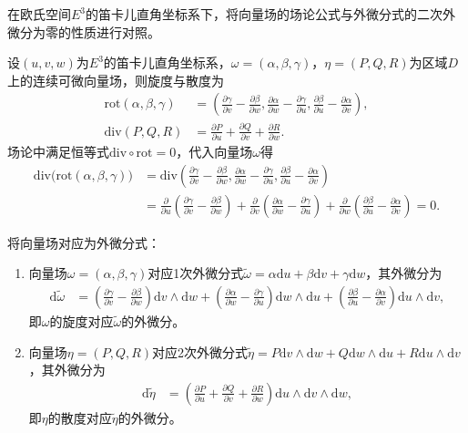 \documentclass[../../main.tex]{subfiles}%
\begin{document}
\begin{example}
在欧氏空间$E^3$的笛卡儿直角坐标系下，将向量场的场论公式与外微分式的二次外微分为零的性质进行对照。
\end{example}
\begin{solution}

设$(u,v,w)$为$E^3$的笛卡儿直角坐标系，$\omega=(\alpha,\beta,\gamma)$，$\eta=(P,Q,R)$为区域$D$上的连续可微向量场，则旋度与散度为
\begin{align*}
\mathrm{rot}(\alpha,\beta,\gamma) &= \left(\frac{\partial\gamma}{\partial v}-\frac{\partial\beta}{\partial w},\frac{\partial\alpha}{\partial w}-\frac{\partial\gamma}{\partial u},\frac{\partial\beta}{\partial u}-\frac{\partial\alpha}{\partial v}\right), \\
\mathrm{div}(P,Q,R) &= \frac{\partial P}{\partial u}+\frac{\partial Q}{\partial v}+\frac{\partial R}{\partial w}.
\end{align*}
场论中满足恒等式$\mathrm{div}\circ\mathrm{rot}=0$，代入向量场$\omega$得
\begin{align*}
\mathrm{div}\big(\mathrm{rot}(\alpha,\beta,\gamma)\big) &= \mathrm{div}\left(\frac{\partial\gamma}{\partial v}-\frac{\partial\beta}{\partial w},\frac{\partial\alpha}{\partial w}-\frac{\partial\gamma}{\partial u},\frac{\partial\beta}{\partial u}-\frac{\partial\alpha}{\partial v}\right) \\
&= \frac{\partial}{\partial u}\left(\frac{\partial\gamma}{\partial v}-\frac{\partial\beta}{\partial w}\right)+\frac{\partial}{\partial v}\left(\frac{\partial\alpha}{\partial w}-\frac{\partial\gamma}{\partial u}\right)+\frac{\partial}{\partial w}\left(\frac{\partial\beta}{\partial u}-\frac{\partial\alpha}{\partial v}\right)=0.
\end{align*}

将向量场对应为外微分式：
\begin{enumerate}[(1)]
\item 向量场$\omega=(\alpha,\beta,\gamma)$对应1次外微分式$\tilde{\omega}=\alpha\mathrm{d}u+\beta\mathrm{d}v+\gamma\mathrm{d}w$，其外微分为
\begin{align*}
\mathrm{d}\tilde{\omega} &= \left(\frac{\partial\gamma}{\partial v}-\frac{\partial\beta}{\partial w}\right)\mathrm{d}v\land\mathrm{d}w+\left(\frac{\partial\alpha}{\partial w}-\frac{\partial\gamma}{\partial u}\right)\mathrm{d}w\land\mathrm{d}u+\left(\frac{\partial\beta}{\partial u}-\frac{\partial\alpha}{\partial v}\right)\mathrm{d}u\land\mathrm{d}v,
\end{align*}
即$\omega$的旋度对应$\tilde{\omega}$的外微分。
\item 向量场$\eta=(P,Q,R)$对应2次外微分式$\tilde{\eta}=P\mathrm{d}v\land\mathrm{d}w+Q\mathrm{d}w\land\mathrm{d}u+R\mathrm{d}u\land\mathrm{d}v$，其外微分为
\begin{align*}
\mathrm{d}\tilde{\eta} &= \left(\frac{\partial P}{\partial u}+\frac{\partial Q}{\partial v}+\frac{\partial R}{\partial w}\right)\mathrm{d}u\land\mathrm{d}v\land\mathrm{d}w,
\end{align*}
即$\eta$的散度对应$\tilde{\eta}$的外微分。
\end{enumerate}


\end{solution}
\end{document}
